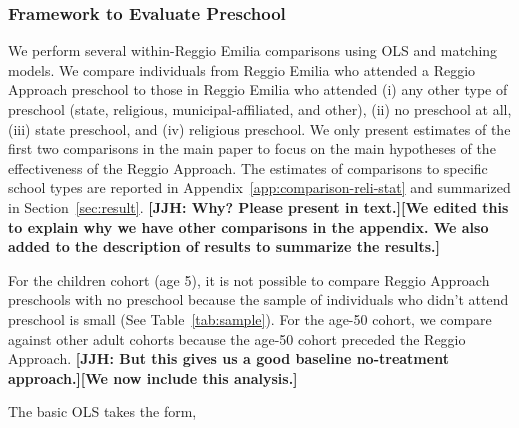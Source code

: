 \subsubsection{Framework to Evaluate Preschool} 
\label{subsubsection:OLS-Preschool}

We perform several within-Reggio Emilia comparisons using OLS and matching models. We compare individuals from Reggio Emilia who attended a Reggio Approach preschool to those in Reggio Emilia who attended (i) any other type of preschool (state, religious, municipal-affiliated, and other), (ii) no preschool at all, (iii) state preschool, and (iv) religious preschool. We only present estimates of the first two comparisons in the main paper to focus on the main hypotheses of the effectiveness of the Reggio Approach. The estimates of comparisons to specific school types are reported in Appendix~\ref{app:comparison-reli-stat} and summarized in Section~\ref{sec:result}. \textbf{[JJH: Why? Please present in text.][We edited this to explain why we have other comparisons in the appendix. We also added to the description of results to summarize the results.]} 

For the children cohort (age 5), it is not possible to compare Reggio Approach preschools with no preschool because the sample of individuals who didn't attend preschool is small (See Table~\ref{tab:sample}). For the age-50 cohort, we compare against other adult cohorts because the age-50 cohort preceded the Reggio Approach. \textbf{[JJH: But this gives us a good baseline no-treatment approach.][We now include this analysis.]}

The basic OLS takes the form,

